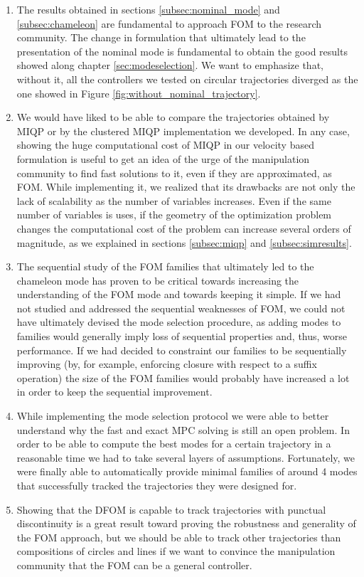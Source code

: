 \documentclass[12,twoside]{TFG-GM}
\theoremstyle{definition}
\theoremstyle{remark}
\begin{document}
\begin{enumerate}

\item The results obtained in sections \ref{subsec:nominal_mode} and \ref{subsec:chameleon} are fundamental to approach FOM to the research community. The change in formulation that ultimately lead to the presentation of the nominal mode is fundamental to obtain the good results showed along chapter \ref{sec:modeselection}. We want to emphasize that, without it, all the controllers we tested on circular trajectories diverged as the one showed in Figure \ref{fig:without_nominal_trajectory}.

\item We would have liked to be able to compare the trajectories obtained by MIQP or by the clustered MIQP implementation we developed. In any case, showing the huge computational cost of MIQP in our velocity based formulation is useful to get an idea of the urge of the manipulation community to find fast solutions to it, even if they are approximated, as FOM. While implementing it, we realized that its drawbacks are not only the lack of scalability as the number of variables increases. Even if the same number of variables is uses, if the geometry of the optimization problem changes the computational cost of the problem can increase several orders of magnitude, as we explained in sections \ref{subsec:miqp} and \ref{subsec:simresults}.

\item The sequential study of the FOM families that ultimately led to the chameleon mode has proven to be critical towards increasing the understanding of the FOM mode and towards keeping it simple. If we had not studied and addressed the sequential weaknesses of FOM, we could not have ultimately devised the mode selection procedure, as adding modes to families would generally imply loss of sequential properties and, thus, worse performance. If we had decided to constraint our families to be sequentially improving (by, for example, enforcing closure with respect to a suffix operation) the size of the FOM families would probably have increased a lot in order to keep the sequential improvement. 

\item While implementing the mode selection protocol we were able to better understand why the fast and exact MPC solving is still an open problem. In order to be able to compute the best modes for a certain trajectory in a reasonable time we had to take several layers of assumptions. Fortunately, we were finally able to automatically provide minimal families of around 4 modes that successfully tracked the trajectories they were designed for.

\item Showing that the DFOM is capable to track trajectories with punctual discontinuity is a great result toward proving the robustness and generality of the FOM approach, but we should be able to track other trajectories than compositions of circles and lines if we want to convince the manipulation community that the FOM can be a general controller.
\end{enumerate}
\end{document}
